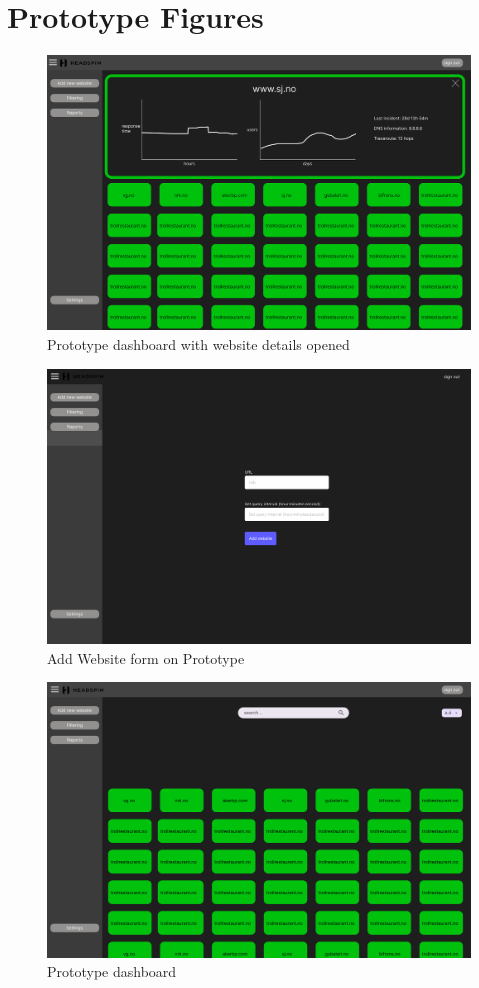 \section{Prototype Figures}
\label{app:prototype_figures}

\begin{figure}
    \centering
    \includegraphics[width=0.75\linewidth]{figures/prototype/prototype_dashboard.png}
    \caption{Prototype dashboard with website details opened}
    \label{fig:appendix_prototype_dashboard}
\end{figure}


\begin{figure}
    \centering
    \includegraphics[width=0.75\linewidth]{figures/prototype/prototype_addwebsite}
    \caption{Add Website form on Prototype}
    \label{fig:appendix_prototype_dashboard}
\end{figure}

\begin{figure}
    \centering
    \includegraphics[width=0.75\linewidth]{figures/prototype/prototype_mini_dashboard.png}
    \caption{Prototype dashboard}
    \label{fig:appendix_prototype_dashboard}
\end{figure}

